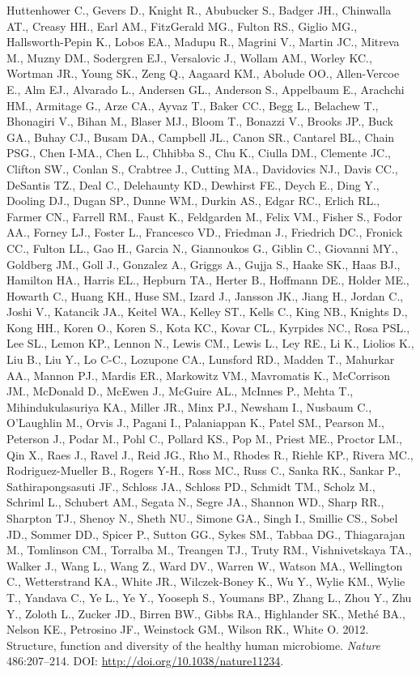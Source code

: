 \documentclass[11pt,]{article}
\begin{document}
Huttenhower C., Gevers D., Knight R., Abubucker S., Badger JH.,
Chinwalla AT., Creasy HH., Earl AM., FitzGerald MG., Fulton RS., Giglio
MG., Hallsworth-Pepin K., Lobos EA., Madupu R., Magrini V., Martin JC.,
Mitreva M., Muzny DM., Sodergren EJ., Versalovic J., Wollam AM., Worley
KC., Wortman JR., Young SK., Zeng Q., Aagaard KM., Abolude OO.,
Allen-Vercoe E., Alm EJ., Alvarado L., Andersen GL., Anderson S.,
Appelbaum E., Arachchi HM., Armitage G., Arze CA., Ayvaz T., Baker CC.,
Begg L., Belachew T., Bhonagiri V., Bihan M., Blaser MJ., Bloom T.,
Bonazzi V., Brooks JP., Buck GA., Buhay CJ., Busam DA., Campbell JL.,
Canon SR., Cantarel BL., Chain PSG., Chen I-MA., Chen L., Chhibba S.,
Chu K., Ciulla DM., Clemente JC., Clifton SW., Conlan S., Crabtree J.,
Cutting MA., Davidovics NJ., Davis CC., DeSantis TZ., Deal C.,
Delehaunty KD., Dewhirst FE., Deych E., Ding Y., Dooling DJ., Dugan SP.,
Dunne WM., Durkin AS., Edgar RC., Erlich RL., Farmer CN., Farrell RM.,
Faust K., Feldgarden M., Felix VM., Fisher S., Fodor AA., Forney LJ.,
Foster L., Francesco VD., Friedman J., Friedrich DC., Fronick CC.,
Fulton LL., Gao H., Garcia N., Giannoukos G., Giblin C., Giovanni MY.,
Goldberg JM., Goll J., Gonzalez A., Griggs A., Gujja S., Haake SK., Haas
BJ., Hamilton HA., Harris EL., Hepburn TA., Herter B., Hoffmann DE.,
Holder ME., Howarth C., Huang KH., Huse SM., Izard J., Jansson JK.,
Jiang H., Jordan C., Joshi V., Katancik JA., Keitel WA., Kelley ST.,
Kells C., King NB., Knights D., Kong HH., Koren O., Koren S., Kota KC.,
Kovar CL., Kyrpides NC., Rosa PSL., Lee SL., Lemon KP., Lennon N., Lewis
CM., Lewis L., Ley RE., Li K., Liolios K., Liu B., Liu Y., Lo C-C.,
Lozupone CA., Lunsford RD., Madden T., Mahurkar AA., Mannon PJ., Mardis
ER., Markowitz VM., Mavromatis K., McCorrison JM., McDonald D., McEwen
J., McGuire AL., McInnes P., Mehta T., Mihindukulasuriya KA., Miller
JR., Minx PJ., Newsham I., Nusbaum C., O'Laughlin M., Orvis J., Pagani
I., Palaniappan K., Patel SM., Pearson M., Peterson J., Podar M., Pohl
C., Pollard KS., Pop M., Priest ME., Proctor LM., Qin X., Raes J., Ravel
J., Reid JG., Rho M., Rhodes R., Riehle KP., Rivera MC.,
Rodriguez-Mueller B., Rogers Y-H., Ross MC., Russ C., Sanka RK., Sankar
P., Sathirapongsasuti JF., Schloss JA., Schloss PD., Schmidt TM., Scholz
M., Schriml L., Schubert AM., Segata N., Segre JA., Shannon WD., Sharp
RR., Sharpton TJ., Shenoy N., Sheth NU., Simone GA., Singh I., Smillie
CS., Sobel JD., Sommer DD., Spicer P., Sutton GG., Sykes SM., Tabbaa
DG., Thiagarajan M., Tomlinson CM., Torralba M., Treangen TJ., Truty
RM., Vishnivetskaya TA., Walker J., Wang L., Wang Z., Ward DV., Warren
W., Watson MA., Wellington C., Wetterstrand KA., White JR.,
Wilczek-Boney K., Wu Y., Wylie KM., Wylie T., Yandava C., Ye L., Ye Y.,
Yooseph S., Youmans BP., Zhang L., Zhou Y., Zhu Y., Zoloth L., Zucker
JD., Birren BW., Gibbs RA., Highlander SK., Methé BA., Nelson KE.,
Petrosino JF., Weinstock GM., Wilson RK., White O. 2012. Structure,
function and diversity of the healthy human microbiome. \emph{Nature}
486:207--214. DOI: \url{http://doi.org/10.1038/nature11234}.
\end{document}
